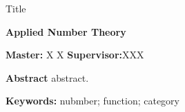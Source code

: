 \clearpage{}
{}

\centerline{Title}

\begin{center}
    {\textbf{Applied Number Theory}}
\end{center}

\begin{center}
    \hspace{1cm} \textbf{Master:} \quad X X \hspace{1.5cm} \textbf{Supervisor:}\quad XXX
\end{center}

\vskip 10bp
{
\hspace{5bp}\textbf{Abstract}
{\small
abstract.
}

\hspace{5bp}\textbf{Keywords:}
{\small nubmber; function; category}
}
